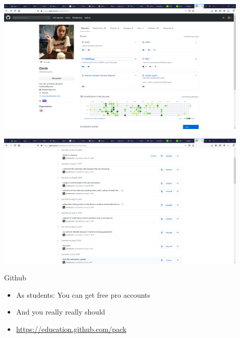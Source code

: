 \documentclass[
  ignorenonframetext,
]{beamer}
\providecommand{\tightlist}{%
  \setlength{\itemsep}{0pt}\setlength{\parskip}{0pt}}
\begin{document}
\begin{frame}

\includegraphics[width=0.9\textwidth,height=\textheight]{../external/images/DB_GIT.PNG}

\end{frame}

\begin{frame}

\includegraphics[width=0.9\textwidth,height=\textheight]{../external/images/DB_GSVD_History.PNG}

\end{frame}

\begin{frame}{Github}
\protect\hypertarget{github}{}

\begin{itemize}[<+->]
\tightlist
\item
  As students: You can get free pro accounts
\item
  And you really really should
\item
  \url{https://education.github.com/pack}
\end{itemize}

\end{frame}
\end{document}
